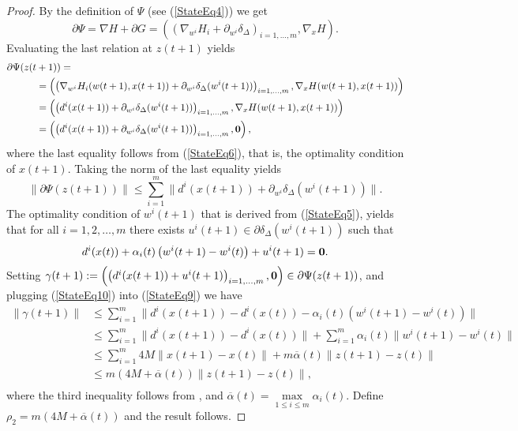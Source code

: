 \documentclass[11pt]{article}
\numberwithin{equation}{section}
\begin{document}
\begin{proof}
By the definition of $\Psi$ (see (\ref{StateEq4})) we get
\begin{equation*}
	\partial \Psi = \nabla H + \partial G  
= \left( \left( \nabla_{w^i} H_i + \partial_{w^i} \delta_{\Delta} \right)_{i=1, \ldots ,m} , \nabla_x H \right) .
\end{equation*}
Evaluating the last relation at $z(t+1)$ yields
\begin{equation*}
\begin{aligned}
	\partial \Psi(z(t & + 1)) = \\
	& = \left( \left( \nabla_{w^i} H_i(w(t+1),x(t+1)) + \partial_{w^i} \delta_{\Delta}(w^i(t+1)) \right)_{i=1, \ldots ,m} , \nabla_x H(w(t+1),x(t+1)) \right) \\
	& = \left( \left( d^i(x(t+1)) + \partial_{w^i} \delta_{\Delta}(w^i(t+1)) \right)_{i=1, \ldots ,m} , \nabla_x H(w(t+1),x(t+1)) \right) \\
	& = \left( \left( d^i(x(t+1)) + \partial_{w^i} \delta_{\Delta}(w^i(t+1)) \right)_{i=1, \ldots ,m} , \bf{0} \right) ,
\end{aligned}
\end{equation*}
where the last equality follows from (\ref{StateEq6}), that is, the optimality condition of $x(t+1)$. Taking the norm of the last equality yields
\begin{equation}
	\| \partial \Psi(z(t+1))\| 
	\leq \sum\limits_{i=1}^{m} \| d^i(x(t+1)) + \partial_{w^i} \delta_{\Delta}(w^i(t+1)) \|. \label{StateEq9}
\end{equation}
The optimality condition of $w^i(t+1)$ that is derived from (\ref{StateEq5}), yields that for all $i=1, 2, \ldots ,m$ there exists $u^i(t+1) \in \partial \delta_{\Delta}(w^i(t+1))$ such that
\begin{equation}
	d^i(x(t)) + \alpha_i(t) \left( w^i(t+1) - w^i(t) \right) + u^i(t+1) = \bf{0} . \label{StateEq10}
\end{equation}
Setting $\gamma(t+1) := \left( \left( d^i(x(t+1)) + u^i(t+1) \right)_{i=1, \ldots ,m}, \bf{0} \right) \in \partial \Psi(z(t+1))$, and plugging (\ref{StateEq10}) into (\ref{StateEq9}) we have
\begin{equation*}
\begin{aligned}
	\| \gamma(t+1) \|
	& \leq \sum\limits_{i=1}^{m} \| d^i(x(t+1)) - d^i(x(t)) - \alpha_i(t) \left( w^i(t+1) - w^i(t) \right) \| \\
	& \leq \sum\limits_{i=1}^{m} \| d^i(x(t+1)) - d^i(x(t)) \| + \sum\limits_{i=1}^{m} \alpha_i(t) \| w^i(t+1) - w^i(t) \| \\
	& \leq \sum\limits_{i=1}^{m} 4M \| x(t+1) - x(t) \| + m \overline{\alpha}(t) \|z(t+1) - z(t)\| \\
	& \leq m \left( 4M + \overline{\alpha}(t) \right) \|z(t+1) - z(t)\| , \\
\end{aligned}
\end{equation*}
where the third inequality follows from , and $\overline{\alpha}(t) = \max\limits_{1 \leq i \leq m} \alpha_i(t)$. Define \\$\rho_2 = m \left( 4M + \overline{\alpha}(t) \right)$ and the result follows.
\end{proof}
\end{document}
